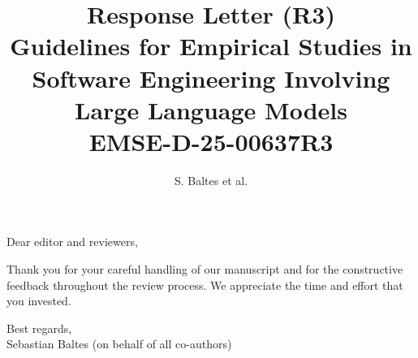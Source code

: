 \documentclass[11pt]{article}
\title{%
  \textbf{Response Letter (R3)}\\
  Guidelines for Empirical Studies in Software Engineering Involving Large Language Models\\
  {\large EMSE-D-25-00637R3}
}
\author{S. Baltes et al.}
\date{}
\begin{document}
\maketitle

\noindent Dear editor and reviewers,

\medskip
\noindent Thank you for your careful handling of our manuscript and for the constructive feedback throughout the review process.
We appreciate the time and effort that you invested.

\medskip
\noindent Best regards,\\
Sebastian Baltes (on behalf of all co-authors)
\end{document}
